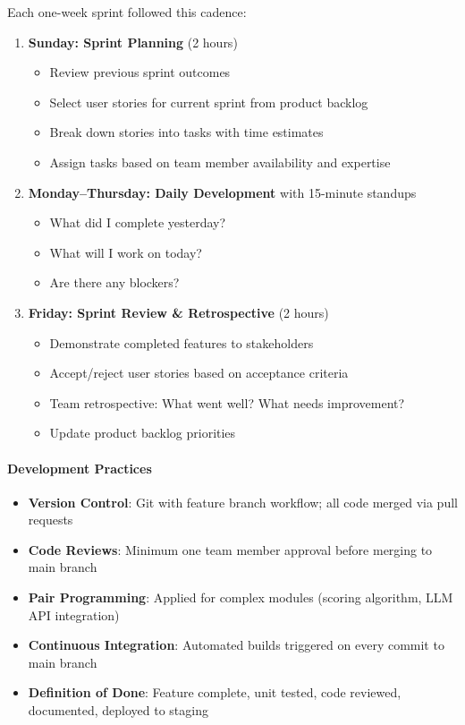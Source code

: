 \documentclass[12pt, a4paper]{article}
\begin{document}
Each one-week sprint followed this cadence:

\begin{enumerate}[leftmargin=1.5em, itemsep=3pt]
    \item \textbf{Sunday: Sprint Planning} (2 hours)
    \begin{itemize}[leftmargin=1.5em, itemsep=2pt]
        \item Review previous sprint outcomes
        \item Select user stories for current sprint from product backlog
        \item Break down stories into tasks with time estimates
        \item Assign tasks based on team member availability and expertise
    \end{itemize}
    
    \item \textbf{Monday--Thursday: Daily Development} with 15-minute standups
    \begin{itemize}[leftmargin=1.5em, itemsep=2pt]
        \item What did I complete yesterday?
        \item What will I work on today?
        \item Are there any blockers?
    \end{itemize}
    
    \item \textbf{Friday: Sprint Review \& Retrospective} (2 hours)
    \begin{itemize}[leftmargin=1.5em, itemsep=2pt]
        \item Demonstrate completed features to stakeholders
        \item Accept/reject user stories based on acceptance criteria
        \item Team retrospective: What went well? What needs improvement?
        \item Update product backlog priorities
    \end{itemize}
\end{enumerate}

\paragraph{Development Practices}

\begin{itemize}[leftmargin=1.5em, itemsep=3pt]
    \item \textbf{Version Control}: Git with feature branch workflow; all code merged via pull requests
    \item \textbf{Code Reviews}: Minimum one team member approval before merging to main branch
    \item \textbf{Pair Programming}: Applied for complex modules (scoring algorithm, LLM API integration)
    \item \textbf{Continuous Integration}: Automated builds triggered on every commit to main branch
    \item \textbf{Definition of Done}: Feature complete, unit tested, code reviewed, documented, deployed to staging
\end{itemize}
\end{document}
